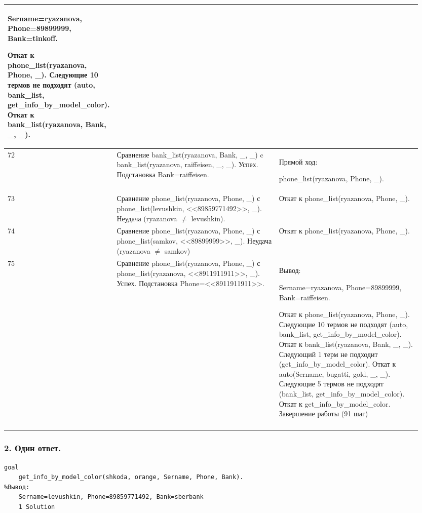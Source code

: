 \documentclass[a4paper,12pt]{article}
\begin{document}
\begin{center}
\begin{longtable}[h!]{|p{0.05\linewidth}|p{0.5\linewidth}|p{ 0.4\linewidth}|}
{					Sername=ryazanova, Phone=89899999, Bank=tinkoff.
				
					Откат к phone\_list(ryazanova, Phone, \_). Следующие 10 термов не подходят (auto, bank\_list, get\_info\_by\_model\_color). Откат к bank\_list(ryazanova, Bank, \_, \_).}\\
				\hline
				{72} & {Сравнение bank\_list(ryazanova, Bank, \_, \_) c bank\_list(ryazanova, raiffeisen, \_, \_). Успех. Подстановка Bank=raiffeisen.} & {Прямой ход:
				
					phone\_list(ryazanova, Phone, \_).}\\
				\hline
				{73} & {Сравнение phone\_list(ryazanova, Phone, \_) с phone\_list(levushkin, <<89859771492>>, \_). Неудача (ryazanova $\neq$ levushkin).} & {Откат к phone\_list(ryazanova, Phone, \_).}\\
				\hline
				{74} & {Сравнение phone\_list(ryazanova, Phone, \_) с phone\_list(samkov, <<89899999>>, \_). Неудача (ryazanova $\neq$ samkov)} & {Откат к phone\_list(ryazanova, Phone, \_).}\\
				\hline
				{75} & {Сравнение phone\_list(ryazanova, Phone, \_) с phone\_list(ryazanova, <<8911911911>>, \_). Успех. Подстановка Phone=<<8911911911>>.} & {Вывод:
					
					Sername=ryazanova, Phone=89899999, Bank=raiffeisen.
					
					Откат к phone\_list(ryazanova, Phone, \_). Следующие 10 термов не подходят (auto, bank\_list, get\_info\_by\_model\_color). Откат к bank\_list(ryazanova, Bank, \_, \_). Следующий 1 терм не подходит (get\_info\_by\_model\_color). Откат к auto(Sername, bugatti, gold, \_, \_). Следующие 5 термов не подходят (bank\_list, get\_info\_by\_model\_color). Откат к get\_info\_by\_model\_color. Завершение работы (91 шаг)}\\
				\hline
			\label{m1}
	\end{longtable}
	\end{center}

	\newpage

	\subsubsection*{2. Один ответ.}
	
	\begin{verbatim}
goal
	get_info_by_model_color(shkoda, orange, Sername, Phone, Bank).
%Вывод:
	Sername=levushkin, Phone=89859771492, Bank=sberbank
	1 Solution
	\end{verbatim}
	
\end{document}
